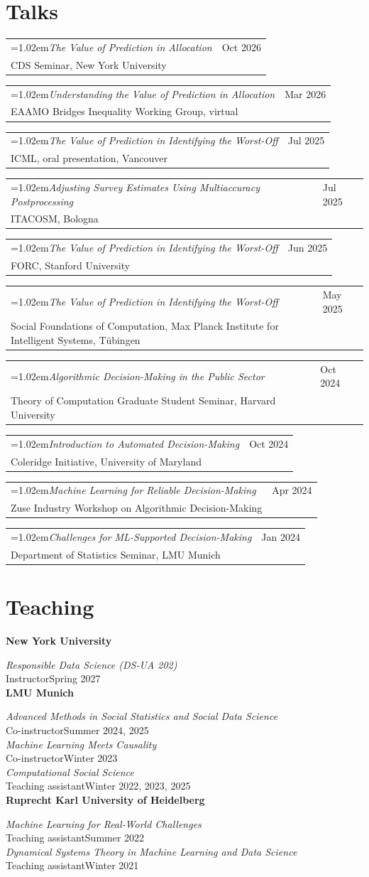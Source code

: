 \documentclass[10pt,letterpaper]{article}
\makeatletter
\newcommand{\talkentry}[3]{%
  \begin{tabularx}{\textwidth}{@{}X@{\hspace{0.16in}}>{\raggedleft\arraybackslash}p{0.76in}@{}}
    {\hangindent=1.02em\hangafter=1\textbullet\hspace{0.44em}\textit{#1}} & #3 \\
    \hspace*{1.02em}\textcolor{secondary}{#2} &
  \end{tabularx}
}
\newcommand{\courseentry}[3]{%
  \textit{#1}\\[-0.08em]
  #2\hfill #3\\
}
\makeatother
\begin{document}
\section{Talks}

\talkentry{The Value of Prediction in Allocation}{CDS Seminar, New York University}{Oct 2026}
\talkentry{Understanding the Value of Prediction in Allocation}{EAAMO Bridges Inequality Working Group, virtual}{Mar 2026}
\talkentry{The Value of Prediction in Identifying the Worst-Off}{ICML, oral presentation, Vancouver}{Jul 2025}
\talkentry{Adjusting Survey Estimates Using Multiaccuracy Postprocessing}{ITACOSM, Bologna}{Jul 2025}
\talkentry{The Value of Prediction in Identifying the Worst-Off}{FORC, Stanford University}{Jun 2025}
\talkentry{The Value of Prediction in Identifying the Worst-Off}{Social Foundations of Computation, Max Planck Institute for Intelligent Systems, T\"ubingen}{May 2025}
\talkentry{Algorithmic Decision-Making in the Public Sector}{Theory of Computation Graduate Student Seminar, Harvard University}{Oct 2024}
\talkentry{Introduction to Automated Decision-Making}{Coleridge Initiative, University of Maryland}{Oct 2024}
\talkentry{Machine Learning for Reliable Decision-Making}{Zuse Industry Workshop on Algorithmic Decision-Making}{Apr 2024}
\talkentry{Challenges for ML-Supported Decision-Making}{Department of Statistics Seminar, LMU Munich}{Jan 2024}

\section{Teaching}

\textbf{New York University}
\vspace{0.06em}

\courseentry{Responsible Data Science (DS-UA 202)}{Instructor}{Spring 2027}

\textbf{LMU Munich}
\vspace{0.06em}

\courseentry{Advanced Methods in Social Statistics and Social Data Science}{Co-instructor}{Summer 2024, 2025}
\courseentry{Machine Learning Meets Causality}{Co-instructor}{Winter 2023}
\courseentry{Computational Social Science}{Teaching assistant}{Winter 2022, 2023, 2025}

\textbf{Ruprecht Karl University of Heidelberg}
\vspace{0.06em}

\courseentry{Machine Learning for Real-World Challenges}{Teaching assistant}{Summer 2022}
\courseentry{Dynamical Systems Theory in Machine Learning and Data Science}{Teaching assistant}{Winter 2021}
\end{document}
